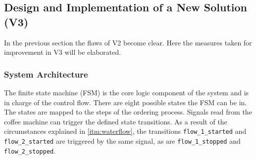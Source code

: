 \documentclass[12pt]{article}
\begin{document}
\subsection{Design and Implementation of a New Solution (V3)}
In the previous section the flaws of V2 become clear.
Here the measures taken for improvement in V3 will be elaborated.
\subsubsection{System Architecture}
The finite state machine (FSM) is the core logic component of the system
and is in charge of the control flow.
There are eight possible states the FSM can be in.
The states are mapped to the steps of the ordering process.
Signals read from the coffee machine can trigger the defined state transitions.
As a result of the circumstances explained in  \autoref{itm:waterflow}, the transitions \texttt{flow\_1\_started} and \texttt{flow\_2\_started} are triggered by the same signal, 
as are \texttt{flow\_1\_stopped} and \texttt{flow\_2\_stopped}. 
\end{document}
